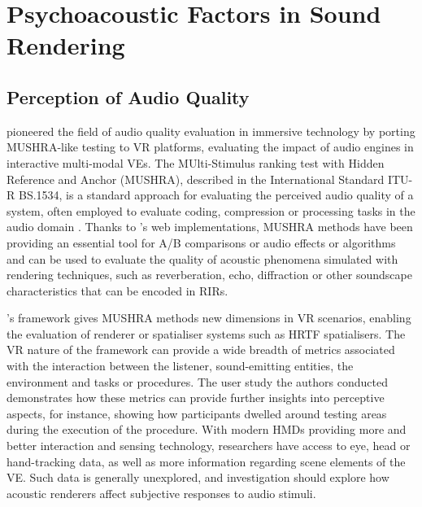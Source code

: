 \section{Psychoacoustic Factors in Sound Rendering}
\cite{gonzalez2023binaural}

\subsection{Perception of Audio Quality}
\cite{rummukainen2018audio} pioneered the field of audio quality evaluation in immersive technology by porting MUSHRA-like testing to VR platforms, evaluating the impact of audio engines in interactive multi-modal VEs. The MUlti-Stimulus ranking test with Hidden Reference and Anchor (MUSHRA), described in the International Standard ITU-R BS.1534, is a standard approach for evaluating the perceived audio quality of a system, often employed to evaluate coding, compression or processing tasks in the audio domain \cite{series2014method}. Thanks to \cite{waet2015}'s web implementations, MUSHRA methods have been providing an essential tool for A/B comparisons or audio effects or algorithms and can be used to evaluate the quality of acoustic phenomena simulated with rendering techniques, such as reverberation, echo, diffraction or other soundscape characteristics that can be encoded in RIRs.\par
\cite{rummukainen2018audio}'s framework gives MUSHRA methods new dimensions in VR scenarios, enabling the evaluation of renderer or spatialiser systems such as HRTF spatialisers. The VR nature of the framework can provide a wide breadth of metrics associated with the interaction between the listener, sound-emitting entities, the environment and tasks or procedures. The user study the authors conducted demonstrates how these metrics can provide further insights into perceptive aspects, for instance, showing how participants dwelled around testing areas during the execution of the procedure. With modern HMDs providing more and better interaction and sensing technology, researchers have access to eye, head or hand-tracking data, as well as more information regarding scene elements of the VE. Such data is generally unexplored, and investigation should explore how acoustic renderers affect subjective responses to audio stimuli.\par

